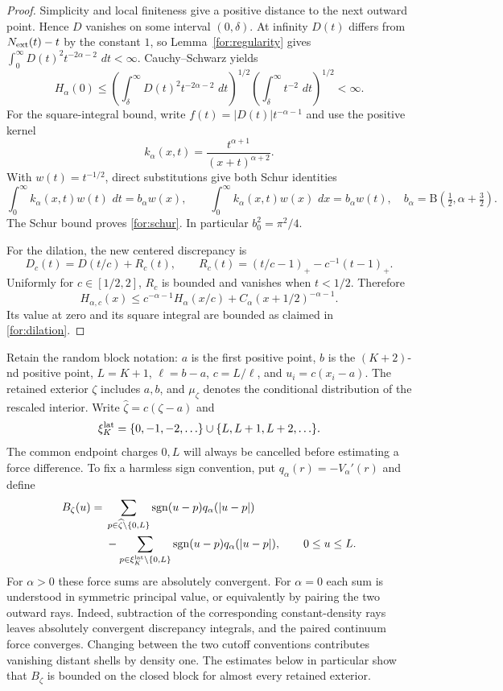 \documentclass[11pt,reqno]{amsart}
\numberwithin{equation}{section}
\theoremstyle{definition}
\newcommand{\1}{\mathbf 1}
\newcommand{\dd}{\,d}
\newcommand{\abs}[1]{\left|#1\right|}
\begin{document}
\begin{proof}
Simplicity and local finiteness give a positive distance to the next
outward point.  Hence $D$ vanishes on some interval $(0,\delta)$.
At infinity $D(t)$ differs from $N_{\rm ext}(t)-t$ by the constant
$1$, so Lemma~\ref{for:regularity} gives
$\int_0^\infty D(t)^2t^{-2\alpha-2}\,\dd t<\infty$.
Cauchy--Schwarz yields
\[
 H_\alpha(0)
 \le\left(\int_\delta^\infty D(t)^2t^{-2\alpha-2}\,\dd t\right)^{1/2}
     \left(\int_\delta^\infty t^{-2}\,\dd t\right)^{1/2}<\infty.
\]
For the square-integral bound, write
$f(t)=\abs{D(t)}t^{-\alpha-1}$ and use the positive kernel
\[
 k_\alpha(x,t)=\frac{t^{\alpha+1}}{(x+t)^{\alpha+2}}.
\]
With $w(t)=t^{-1/2}$, direct substitutions give both Schur identities
\[
 \int_0^\infty k_\alpha(x,t)w(t)\,\dd t
 =b_\alpha w(x),\qquad
 \int_0^\infty k_\alpha(x,t)w(x)\,\dd x
 =b_\alpha w(t),
 \quad b_\alpha=\mathrm B\left(\tfrac12,\alpha+\tfrac32\right).
\]
The Schur bound proves \eqref{for:schur}.  In particular
$b_0^2=\pi^2/4$.

For the dilation, the new centered discrepancy is
\[
 D_c(t)=D(t/c)+R_c(t),\qquad
 R_c(t)=(t/c-1)_+-c^{-1}(t-1)_+.
\]
Uniformly for $c\in[1/2,2]$, $R_c$ is bounded and vanishes when
$t<1/2$.  Therefore
\[
 H_{\alpha,c}(x)
 \le c^{-\alpha-1}H_\alpha(x/c)
       +C_\alpha(x+1/2)^{-\alpha-1}.
\]
Its value at zero and its square integral are bounded as claimed in
\eqref{for:dilation}.
\end{proof}

Retain the random block notation: $a$ is the first positive point,
$b$ is the $(K+2)$-nd positive point, $L=K+1$, $\ell=b-a$,
$c=L/\ell$, and $u_i=c(x_i-a)$.  The retained exterior $\zeta$
includes $a,b$, and $\mu_\zeta$ denotes the conditional distribution
of the rescaled interior.  Write $\widehat\zeta=c(\zeta-a)$ and
\[
 \xi_K^{\rm lat}=\{0,-1,-2,\ldots\}\cup\{L,L+1,L+2,\ldots\}.
\]
The common endpoint charges $0,L$ will always be cancelled before
estimating a force difference.  To fix a harmless sign convention, put
$q_\alpha(r)=-V_\alpha'(r)$ and define
\begin{equation}\label{for:force-def}
 \begin{split}
 B_\zeta(u)={}&
 \sum_{p\in\widehat\zeta\setminus\{0,L\}}
     \operatorname{sgn}(u-p)q_\alpha(\abs{u-p})\\
 &-\sum_{p\in\xi_K^{\rm lat}\setminus\{0,L\}}
     \operatorname{sgn}(u-p)q_\alpha(\abs{u-p}),\qquad 0\le u\le L.
 \end{split}
\end{equation}
For $\alpha>0$ these force sums are absolutely convergent.  For
$\alpha=0$ each sum is understood in symmetric principal value, or
equivalently by pairing the two outward rays.  Indeed, subtraction of
the corresponding constant-density rays leaves absolutely convergent
discrepancy integrals, and the paired continuum force converges.
Changing between the two cutoff conventions contributes vanishing
distant shells by density one.  The estimates below in particular
show that $B_\zeta$ is bounded on the closed block for almost every
retained exterior.
\end{document}
